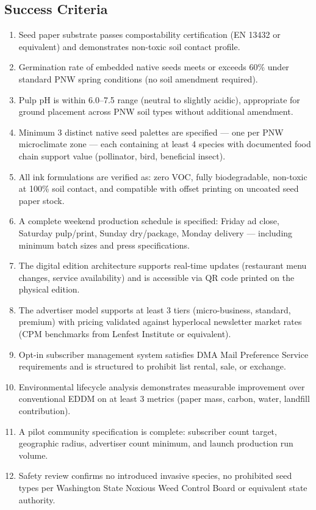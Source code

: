 \documentclass[11pt,letterpaper]{article}
\begin{document}
\subsection{Success Criteria}

\begin{enumerate}
  \item Seed paper substrate passes compostability certification (EN 13432 or equivalent) and demonstrates non-toxic soil contact profile.
  \item Germination rate of embedded native seeds meets or exceeds 60\% under standard PNW spring conditions (no soil amendment required).
  \item Pulp pH is within 6.0--7.5 range (neutral to slightly acidic), appropriate for ground placement across PNW soil types without additional amendment.
  \item Minimum 3 distinct native seed palettes are specified --- one per PNW microclimate zone --- each containing at least 4 species with documented food chain support value (pollinator, bird, beneficial insect).
  \item All ink formulations are verified as: zero VOC, fully biodegradable, non-toxic at 100\% soil contact, and compatible with offset printing on uncoated seed paper stock.
  \item A complete weekend production schedule is specified: Friday ad close, Saturday pulp/print, Sunday dry/package, Monday delivery --- including minimum batch sizes and press specifications.
  \item The digital edition architecture supports real-time updates (restaurant menu changes, service availability) and is accessible via QR code printed on the physical edition.
  \item The advertiser model supports at least 3 tiers (micro-business, standard, premium) with pricing validated against hyperlocal newsletter market rates (CPM benchmarks from Lenfest Institute or equivalent).
  \item Opt-in subscriber management system satisfies DMA Mail Preference Service requirements and is structured to prohibit list rental, sale, or exchange.
  \item Environmental lifecycle analysis demonstrates measurable improvement over conventional EDDM on at least 3 metrics (paper mass, carbon, water, landfill contribution).
  \item A pilot community specification is complete: subscriber count target, geographic radius, advertiser count minimum, and launch production run volume.
  \item Safety review confirms no introduced invasive species, no prohibited seed types per Washington State Noxious Weed Control Board or equivalent state authority.
\end{enumerate}
\end{document}
